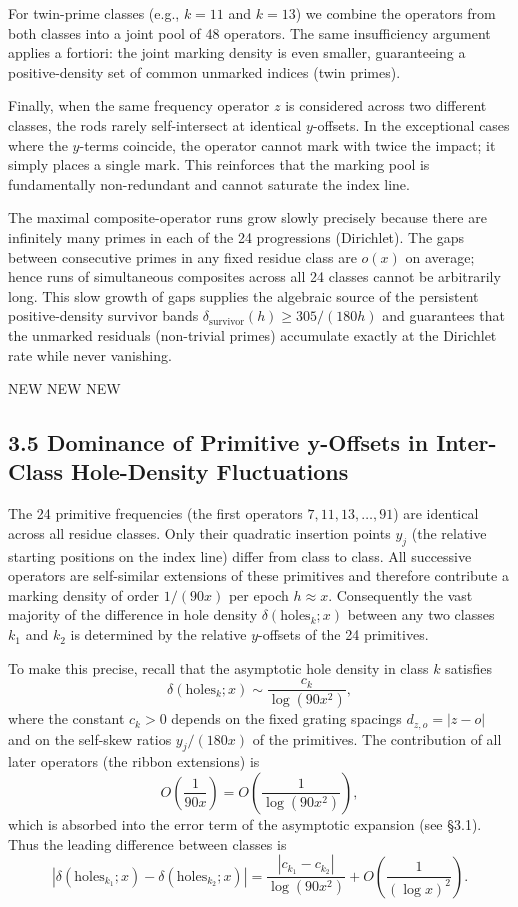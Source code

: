 \documentclass[11pt,a4paper]{article}
\begin{document}
{For twin-prime classes (e.g., \(k=11\) and \(k=13\)) we combine the operators from both classes into a joint pool of 48 operators. The same insufficiency argument applies a fortiori: the joint marking density is even smaller, guaranteeing a positive-density set of common unmarked indices (twin primes).

Finally, when the same frequency operator \(z\) is considered across two different classes, the rods rarely self-intersect at identical \(y\)-offsets. In the exceptional cases where the \(y\)-terms coincide, the operator cannot mark with twice the impact; it simply places a single mark. This reinforces that the marking pool is fundamentally non-redundant and cannot saturate the index line.

The maximal composite-operator runs grow slowly precisely because there are infinitely many primes in each of the 24 progressions (Dirichlet). The gaps between consecutive primes in any fixed residue class are \(o(x)\) on average; hence runs of simultaneous composites across all 24 classes cannot be arbitrarily long. This slow growth of gaps supplies the algebraic source of the persistent positive-density survivor bands \(\delta_{\mathrm{survivor}}(h)\geq 305/(180h)\) and guarantees that the unmarked residuals (non-trivial primes) accumulate exactly at the Dirichlet rate while never vanishing.}


NEW NEW NEW

\subsection{ 3.5 Dominance of Primitive y-Offsets in Inter-Class Hole-Density Fluctuations} 

The 24 primitive frequencies (the first operators \(7,11,13,\dots,91\)) are identical across all residue classes. Only their quadratic insertion points \(y_j\) (the relative starting positions on the index line) differ from class to class. All successive operators are self-similar extensions of these primitives and therefore contribute a marking density of order \(1/(90x)\) per epoch \(h\approx x\). Consequently the vast majority of the difference in hole density \(\delta(\mathrm{holes}_{k};x)\) between any two classes \(k_1\) and \(k_2\) is determined by the relative \(y\)-offsets of the 24 primitives.

To make this precise, recall that the asymptotic hole density in class \(k\) satisfies
\[
\delta(\mathrm{holes}_k;x)\sim\frac{c_k}{\log(90x^2)},
\]
where the constant \(c_k>0\) depends on the fixed grating spacings \(d_{z,o}=|z-o|\) and on the self-skew ratios \(y_j/(180x)\) of the primitives. The contribution of all later operators (the ribbon extensions) is
\[
O\left(\frac{1}{90x}\right)=O\left(\frac{1}{\log(90x^2)}\right),
\]
which is absorbed into the error term of the asymptotic expansion (see §3.1). Thus the leading difference between classes is
\[
|\delta(\mathrm{holes}_{k_1};x)-\delta(\mathrm{holes}_{k_2};x)|=\frac{|c_{k_1}-c_{k_2}|}{\log(90x^2)}+O\left(\frac{1}{(\log x)^2}\right).
\]
\end{document}
